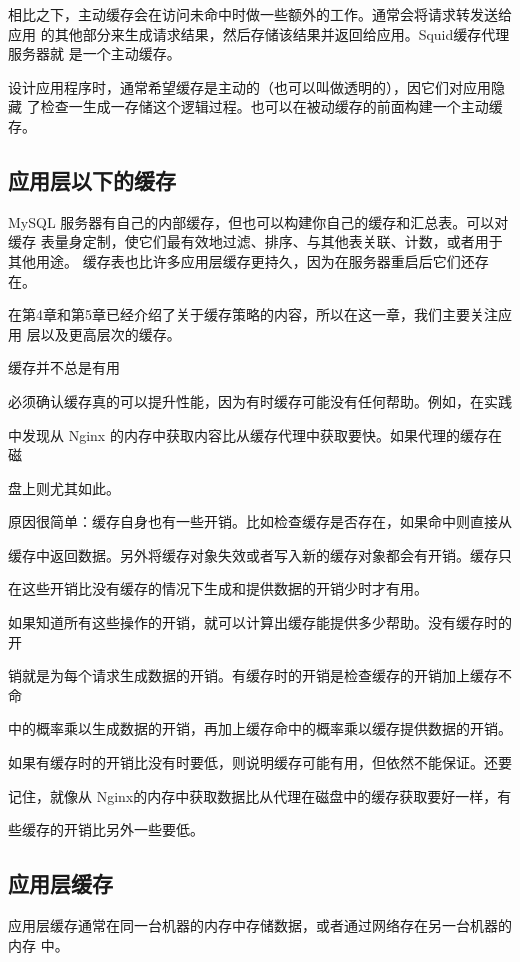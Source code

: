 相比之下，主动缓存会在访问未命中时做一些额外的工作。通常会将请求转发送给应用
的其他部分来生成请求结果，然后存储该结果并返回给应用。Squid缓存代理服务器就
是一个主动缓存。

设计应用程序时，通常希望缓存是主动的（也可以叫做透明的），因它们对应用隐藏
了检查一生成一存储这个逻辑过程。也可以在被动缓存的前面构建一个主动缓存。

\subsection{应用层以下的缓存}
MySQL 服务器有自己的内部缓存，但也可以构建你自己的缓存和汇总表。可以对缓存
表量身定制，使它们最有效地过滤、排序、与其他表关联、计数，或者用于其他用途。
缓存表也比许多应用层缓存更持久，因为在服务器重启后它们还存在。

在第4章和第5章已经介绍了关于缓存策略的内容，所以在这一章，我们主要关注应用
层以及更高层次的缓存。

缓存并不总是有用

必须确认缓存真的可以提升性能，因为有时缓存可能没有任何帮助。例如，在实践

中发现从 Nginx 的内存中获取内容比从缓存代理中获取要快。如果代理的缓存在磁

盘上则尤其如此。

原因很简单：缓存自身也有一些开销。比如检查缓存是否存在，如果命中则直接从

缓存中返回数据。另外将缓存对象失效或者写入新的缓存对象都会有开销。缓存只

在这些开销比没有缓存的情况下生成和提供数据的开销少时才有用。

如果知道所有这些操作的开销，就可以计算出缓存能提供多少帮助。没有缓存时的开

销就是为每个请求生成数据的开销。有缓存时的开销是检查缓存的开销加上缓存不命

中的概率乘以生成数据的开销，再加上缓存命中的概率乘以缓存提供数据的开销。

如果有缓存时的开销比没有时要低，则说明缓存可能有用，但依然不能保证。还要

记住，就像从 Nginx的内存中获取数据比从代理在磁盘中的缓存获取要好一样，有

些缓存的开销比另外一些要低。

\subsection{应用层缓存}
应用层缓存通常在同一台机器的内存中存储数据，或者通过网络存在另一台机器的内存
中。

